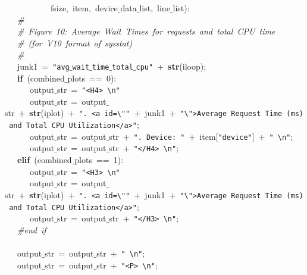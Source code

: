 \mbox{}\ \ \ \ \ \ \ \ \ \ \ fsize,\ item,\ device$\_$data$\_$list,\ line$\_$list): \\
\mbox{}\ \ \ \textit{\#} \\
\mbox{}\ \ \ \textit{\#\ Figure\ 10:\ Average\ Wait\ Times\ for\ requests\ and\ total\ CPU\ time} \\
\mbox{}\ \ \ \textit{\#\ (for\ V10\ format\ of\ sysstat)} \\
\mbox{}\ \ \ \textit{\#} \\
\mbox{}\ \ \ junk1\ =\ \texttt{"{}avg$\_$wait$\_$time$\_$total$\_$cpu"{}}\ +\ \textbf{str}(iloop); \\
\mbox{}\ \ \ \textbf{if}\ (combined$\_$plots\ ==\ 0): \\
\mbox{}\ \ \ \ \ \ output$\_$str\ =\ \texttt{"{}\textless{}H4\textgreater{}\ \textbackslash{}n"{}} \\
\mbox{}\ \ \ \ \ \ output$\_$str\ =\ output$\_$str\ +\ \textbf{str}(iplot)\ +\ \texttt{"{}.\ \textless{}a\ id=\textbackslash{}"{}"{}}\ +\ junk1\ +\ \texttt{"{}\textbackslash{}"{}\textgreater{}Average\ Request\ Time\ (ms)\ and\ Total\ CPU\ Utilization\textless{}/a\textgreater{}"{}}; \\
\mbox{}\ \ \ \ \ \ output$\_$str\ =\ output$\_$str\ +\ \texttt{"{}.\ Device:\ "{}}\ +\ item[\texttt{"{}device"{}}]\ +\ \texttt{"{}\ \textbackslash{}n"{}}; \\
\mbox{}\ \ \ \ \ \ output$\_$str\ =\ output$\_$str\ +\ \texttt{"{}\textless{}/H4\textgreater{}\ \textbackslash{}n"{}}; \\
\mbox{}\ \ \ \textbf{elif}\ (combined$\_$plots\ ==\ 1): \\
\mbox{}\ \ \ \ \ \ output$\_$str\ =\ \texttt{"{}\textless{}H3\textgreater{}\ \textbackslash{}n"{}} \\
\mbox{}\ \ \ \ \ \ output$\_$str\ =\ output$\_$str\ +\ \textbf{str}(iplot)\ +\ \texttt{"{}.\ \textless{}a\ id=\textbackslash{}"{}"{}}\ +\ junk1\ +\ \texttt{"{}\textbackslash{}"{}\textgreater{}Average\ Request\ Time\ (ms)\ and\ Total\ CPU\ Utilization\textless{}/a\textgreater{}"{}}; \\
\mbox{}\ \ \ \ \ \ output$\_$str\ =\ output$\_$str\ +\ \texttt{"{}\textless{}/H3\textgreater{}\ \textbackslash{}n"{}}; \\
\mbox{}\ \ \ \textit{\#end\ if} \\
\mbox{}\ \ \  \\
\mbox{}\ \ \ output$\_$str\ =\ output$\_$str\ +\ \texttt{"{}\ \textbackslash{}n"{}}; \\
\mbox{}\ \ \ output$\_$str\ =\ output$\_$str\ +\ \texttt{"{}\textless{}P\textgreater{}\ \textbackslash{}n"{}}; \\
